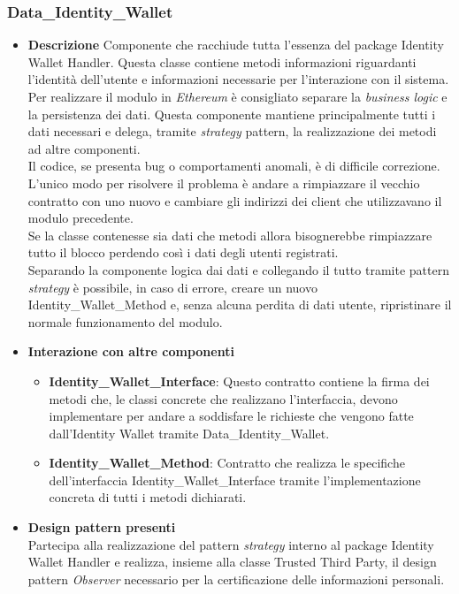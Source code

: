 \subsubsection{Data\_Identity\_Wallet}
\begin{itemize}
	\item \textbf{Descrizione}
	Componente che racchiude tutta l'essenza del package Identity Wallet Handler.
	Questa classe contiene metodi informazioni riguardanti l'identità dell'utente e informazioni necessarie per l'interazione con il sistema.\\
	Per realizzare il modulo in \textit{Ethereum} è consigliato separare la \textit{business logic} e la persistenza dei dati. Questa componente mantiene principalmente tutti i dati necessari e delega, tramite \textit{strategy} pattern, la realizzazione dei metodi ad altre componenti.\\
	Il codice, se presenta bug o comportamenti anomali, è di difficile correzione. L'unico modo per risolvere il problema è andare a rimpiazzare il vecchio contratto con uno nuovo e cambiare gli indirizzi dei client che utilizzavano il modulo precedente.\\
	Se la classe contenesse sia dati che metodi allora bisognerebbe rimpiazzare tutto il blocco perdendo così i dati degli utenti registrati.\\
	Separando la componente logica dai dati e collegando il tutto tramite pattern \textit{strategy} è possibile, in caso di errore, creare un nuovo Identity\_Wallet\_Method e, senza alcuna perdita di dati utente, ripristinare il normale funzionamento del modulo.	
	\item \textbf{Interazione con altre componenti}
	\begin{itemize}
		\item\textbf{ Identity\_Wallet\_Interface}: Questo contratto contiene la firma dei metodi che, le classi concrete che realizzano l'interfaccia, devono implementare per andare a soddisfare le richieste che vengono fatte dall'Identity Wallet tramite Data\_Identity\_Wallet.
		\item\textbf{ Identity\_Wallet\_Method}: Contratto che realizza le specifiche dell'interfaccia Identity\_Wallet\_Interface tramite l'implementazione concreta di tutti i metodi dichiarati.
	\end{itemize}
	\item \textbf{Design pattern presenti}\\
	Partecipa alla realizzazione del pattern \textit{strategy} interno al package Identity Wallet Handler e realizza, insieme alla classe Trusted Third Party, il design pattern \textit{Observer} necessario per la certificazione delle informazioni personali.
\end{itemize}
